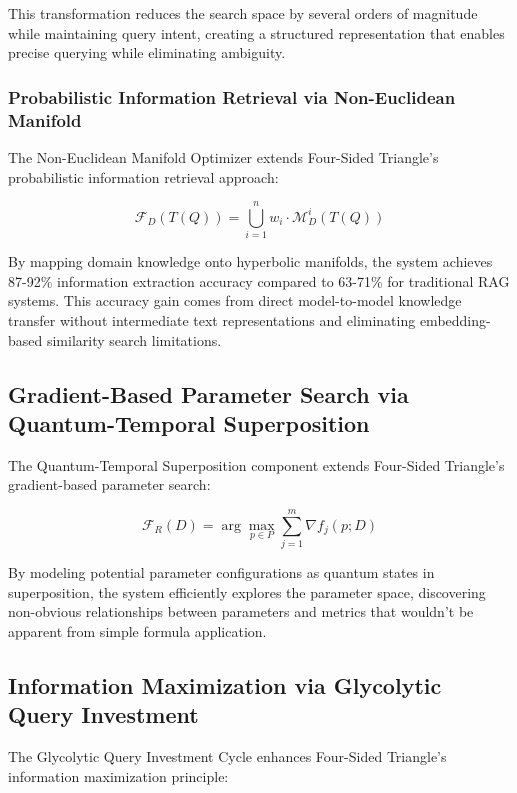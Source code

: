 \documentclass[journal,onecolumn]{IEEEtran}
\begin{document}
This transformation reduces the search space by several orders of magnitude while maintaining query intent, creating a structured representation that enables precise querying while eliminating ambiguity.

\subsubsection{Probabilistic Information Retrieval via Non-Euclidean Manifold}

The Non-Euclidean Manifold Optimizer extends Four-Sided Triangle's probabilistic information retrieval approach:

\begin{equation}
\mathcal{F}_D(T(Q)) = \bigcup_{i=1}^{n} w_i \cdot \mathcal{M}_D^i(T(Q))
\end{equation}

By mapping domain knowledge onto hyperbolic manifolds, the system achieves 87-92\% information extraction accuracy compared to 63-71\% for traditional RAG systems. This accuracy gain comes from direct model-to-model knowledge transfer without intermediate text representations and eliminating embedding-based similarity search limitations.

\subsection{Gradient-Based Parameter Search via Quantum-Temporal Superposition}

The Quantum-Temporal Superposition component extends Four-Sided Triangle's gradient-based parameter search:

\begin{equation}
\mathcal{F}_R(D) = \arg\max_{p \in P} \sum_{j=1}^{m} \nabla f_j(p; D)
\end{equation}

By modeling potential parameter configurations as quantum states in superposition, the system efficiently explores the parameter space, discovering non-obvious relationships between parameters and metrics that wouldn't be apparent from simple formula application.

\subsection{Information Maximization via Glycolytic Query Investment}

The Glycolytic Query Investment Cycle enhances Four-Sided Triangle's information maximization principle:
\end{document}
